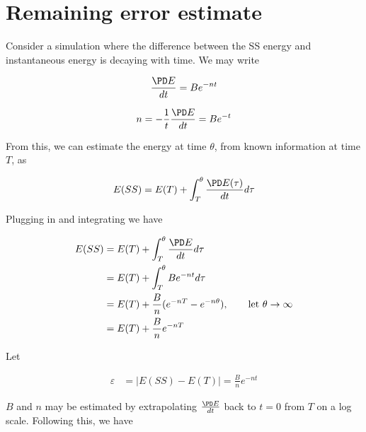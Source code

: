 \documentclass[11pt]{article}
\begin{document}
\doublespacing
\MOONSTITLE
\maketitle

\section{Remaining error estimate}
Consider a simulation where the difference between the SS energy and instantaneous energy is decaying with time. We may write

\begin{equation}
	\frac{\PD E}{dt} = B e^{-n t}
\end{equation}

\begin{equation}
	n = - \frac{1}{t} \frac{\PD E}{dt} = B e^{- t}
\end{equation}

From this, we can estimate the energy at time $\theta$, from known information at time $T$, as

\begin{equation}
	E(SS) = E(T) + \int_{T}^{\theta} \frac{\PD E(\tau)}{dt} d\tau
\end{equation}

Plugging in and integrating we have

\begin{equation} \begin{aligned}
	E(SS) &= E(T) + \int_{T}^{\theta} \frac{\PD E}{dt} d\tau \\
	      &= E(T) + \int_{T}^{\theta} B e^{-n t} d\tau \\
	      &= E(T) + \frac{B}{n} (e^{-n T} - e^{-n \theta}), \qquad \text{let } \theta \rightarrow \infty \\
	      &= E(T) + \frac{B}{n} e^{-n T} \\
\end{aligned} \end{equation}

Let

\begin{equation} \begin{aligned}
	\varepsilon &= |E(SS)-E(T)| = \frac{B}{n} e^{-n t}
\end{aligned} \end{equation}

$B$ and $n$ may be estimated by extrapolating $\frac{\PD E}{dt}$ back to $t=0$ from $T$ on a log scale. Following this, we have
\end{document}
